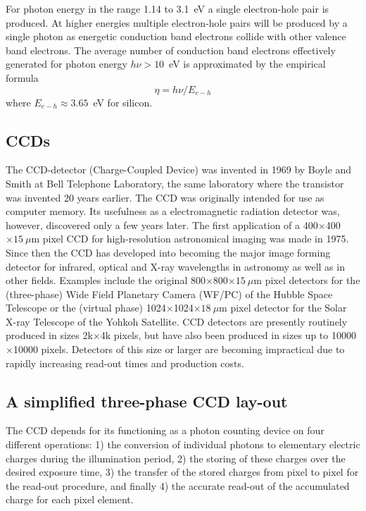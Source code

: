 For photon energy in the range 1.14 to 3.1~eV a single electron-hole pair
is produced. At higher energies multiple electron-hole pairs will be
produced by a single photon as energetic conduction band electrons
collide with other valence band electrons. The average number of
conduction band electrons effectively generated for photon energy
$h\nu > 10$~eV is approximated by the empirical formula
\begin{equation}
  \eta = h\nu/E_{e-h}
\end{equation}
where $E_{e-h} \approx 3.65$~eV for silicon.

\subsection{CCDs}

The CCD-detector (Charge-Coupled Device) was invented in 1969 by Boyle
and Smith at Bell Telephone Laboratory, the same laboratory where the
transistor was invented 20 years earlier. The CCD was originally
intended for use as computer memory. Its usefulness as a
electromagnetic radiation detector was, however, discovered only a few
years later. The first application of a 400$\times$400$\times 15~\mu$m
pixel CCD for high-resolution astronomical imaging was made in
1975. Since then the CCD has developed into becoming the major image
forming detector for infrared, optical and X-ray wavelengths in
astronomy as well as in other fields.  Examples include the original
800$\times$800$\times 15~\mu$m pixel detectors for the (three-phase)
Wide Field Planetary Camera (WF/PC) of the Hubble Space Telescope or
the (virtual phase) 1024$\times$1024$\times 18~\mu$m pixel detector
for the Solar X-ray Telescope of the Yohkoh Satellite. CCD detectors
are presently routinely produced in sizes 2k$\times$4k pixels, but
have also been produced in sizes up to 10000$\times$10000
pixels. Detectors of this size or larger are becoming impractical due
to rapidly increasing read-out times and production costs.

\subsection{A simplified three-phase CCD lay-out}

The CCD depends for its functioning as a photon counting device on
four different operations: 1) the conversion of individual photons to
elementary electric charges during the illumination period, 2) the
storing of these charges over the desired exposure time, 3) the
transfer of the stored charges from pixel to pixel for the read-out
procedure, and finally 4) the accurate read-out of the accumulated
charge for each pixel element.  

